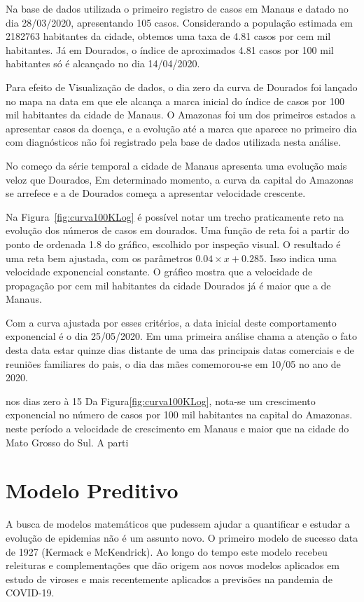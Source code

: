 \documentclass[12pt]{article}
\begin{document}
Na base de dados utilizada o primeiro registro de casos em Manaus e datado no dia 28/03/2020, apresentando 105 casos. Considerando a população estimada em 2182763 habitantes da cidade, obtemos uma taxa de 4.81 casos por cem mil habitantes. Já em Dourados, o índice de aproximados 4.81 casos por 100 mil habitantes só é alcançado no dia 14/04/2020.

Para efeito de Visualização de dados, o dia zero da curva de Dourados foi lançado no mapa na data em que ele alcança a marca inicial do índice de casos por 100 mil habitantes da cidade de Manaus. O Amazonas foi um dos primeiros estados a apresentar casos da doença, e a evolução até a marca que aparece no primeiro dia com diagnósticos não foi registrado pela base de dados utilizada nesta análise. 

No começo da série temporal a cidade de Manaus apresenta uma evolução mais veloz que Dourados, Em determinado momento, a curva da capital do Amazonas se arrefece e a de Dourados começa a apresentar velocidade crescente.

Na Figura~\ref{fig:curva100KLog} é possível notar um trecho praticamente reto na evolução dos números de casos em dourados. Uma função de reta foi a partir do ponto de ordenada 1.8 do gráfico, escolhido por inspeção visual. O resultado é uma reta bem ajustada, com os parâmetros \(0.04 \times x + 0.285\). Isso indica uma velocidade exponencial constante. O gráfico mostra que a velocidade de propagação por cem mil habitantes da cidade Dourados já é maior que a de Manaus.

Com a curva ajustada por esses critérios, a data inicial deste comportamento exponencial é o dia 25/05/2020. Em uma primeira análise chama a atenção o fato desta data estar quinze dias distante de uma das principais datas comerciais e de reuniões familiares do pais, o dia das mães comemorou-se em 10/05 no ano de 2020.

nos dias zero à 15 Da Figura\ref{fig:curva100KLog}, nota-se um crescimento exponencial no número de casos por 100 mil habitantes na capital do Amazonas. neste período a velocidade de crescimento em Manaus e maior que na cidade do Mato Grosso do Sul. A parti

\section{Modelo Preditivo}

A busca de modelos matemáticos que pudessem ajudar a quantificar e estudar a evolução de epidemias não é um assunto novo. O primeiro modelo de sucesso data de 1927 (Kermack e McKendrick)\cite{doi:10.1098/rspa.1927.0118}. Ao longo do tempo este modelo recebeu releituras e complementações que dão origem aos novos modelos aplicados em estudo de viroses e mais recentemente aplicados a previsões na pandemia de COVID-19. 
\end{document}
